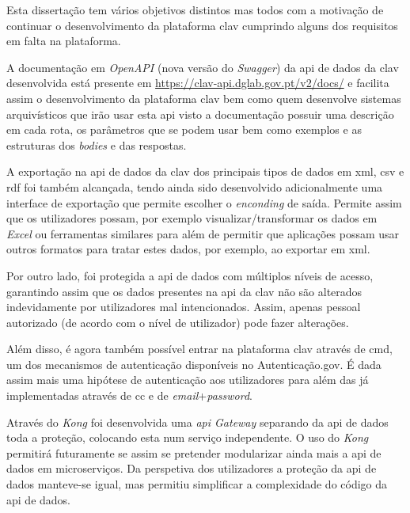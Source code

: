 Esta dissertação tem vários objetivos distintos mas todos com a motivação de continuar o desenvolvimento da plataforma \acrshort{clav} cumprindo alguns dos requisitos em falta na plataforma.

A documentação em \textit{OpenAPI} (nova versão do \textit{Swagger}) da \acrshort{api} de dados da \acrshort{clav} desenvolvida está presente em \url{https://clav-api.dglab.gov.pt/v2/docs/} e facilita assim o desenvolvimento da plataforma \acrshort{clav} bem como quem desenvolve sistemas arquivísticos que irão usar esta \acrshort{api} visto a documentação possuir uma descrição em cada rota, os parâmetros que se podem usar bem como exemplos e as estruturas dos \textit{bodies} e das respostas.

A exportação na \acrshort{api} de dados da \acrshort{clav} dos principais tipos de dados em \acrshort{xml}, \acrshort{csv} e \acrshort{rdf} foi também alcançada, tendo ainda sido desenvolvido adicionalmente uma interface de exportação que permite escolher o \textit{enconding} de saída. Permite assim que os utilizadores possam, por exemplo visualizar/transformar os dados em \textit{Excel} ou ferramentas similares para além de permitir que aplicações possam usar outros formatos para tratar estes dados, por exemplo, ao exportar em \acrshort{xml}.

Por outro lado, foi protegida a \acrshort{api} de dados com múltiplos níveis de acesso, garantindo assim que os dados presentes na \acrshort{api} da \acrshort{clav} não são alterados indevidamente por utilizadores mal intencionados. Assim, apenas pessoal autorizado (de acordo com o nível de utilizador) pode fazer alterações.

Além disso, é agora também possível entrar na plataforma \acrshort{clav} através de \acrfull{cmd}, um dos mecanismos de autenticação disponíveis no Autenticação.gov. É dada assim mais uma hipótese de autenticação aos utilizadores para além das já implementadas através de \acrshort{cc} e de \textit{email}+\textit{password}.

Através do \textit{Kong} foi desenvolvida uma \textit{\acrshort{api} Gateway} separando da \acrshort{api} de dados toda a proteção, colocando esta num serviço independente. O uso do \textit{Kong} permitirá futuramente se assim se pretender modularizar ainda mais a \acrshort{api} de dados em microserviços. Da perspetiva dos utilizadores a proteção da \acrshort{api} de dados manteve-se igual, mas permitiu simplificar a complexidade do código da \acrshort{api} de dados.

